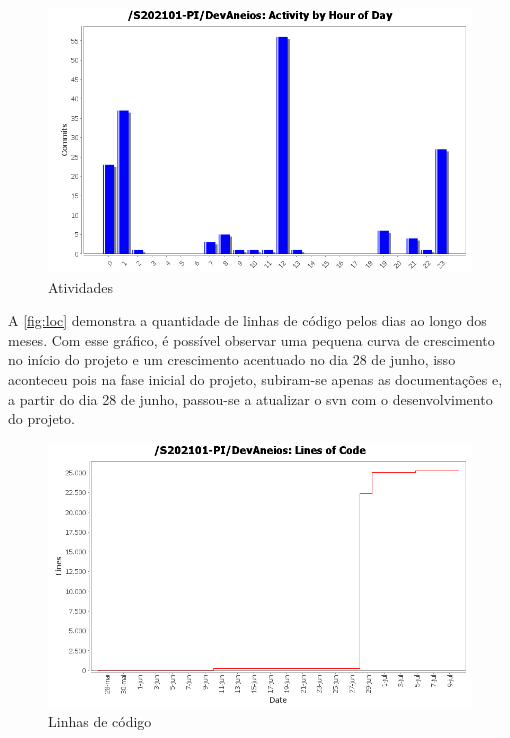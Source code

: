 \documentclass[
    12pt,               %
    openright,          %
    oneside,
    a4paper,            %
    english,            %
    brazil              %
    ]{ifsp-spo-inf-ctds} %
\begin{document}
\begin{figure}[htb]
    \centering
	\includegraphics[width=16cm]{imagens/activity_time.png}
	\caption{\label{fig:time} Atividades}
\end{figure}
\FloatBarrier

A \autoref{fig:loc} demonstra a quantidade de linhas de código pelos dias ao longo dos meses. Com esse gráfico, é possível observar uma pequena curva de crescimento no início do projeto e um crescimento acentuado no dia 28 de junho, isso aconteceu pois na fase inicial do projeto, subiram-se apenas as documentações e, a partir do dia 28 de junho, passou-se a atualizar o \gls{svn} com o desenvolvimento do projeto.

\begin{figure}[htb]
    \centering
	\includegraphics[width=16cm]{imagens/loc.png}
	\caption{\label{fig:loc} Linhas de código}
\end{figure}
\FloatBarrier
\end{document}

